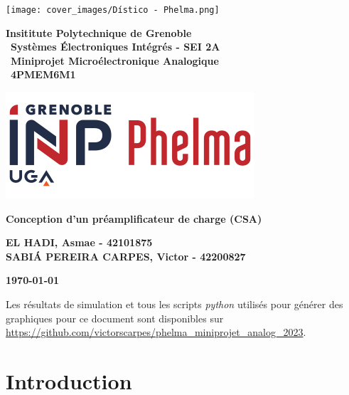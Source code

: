 \documentclass[a4paper,12pt]{article}
\numberwithin{equation}{section}
\newcommand{\?}{\stackrel{?}{=}}
\begin{document}
\noindent
    \parbox{2.3cm}{\texttt{[image: cover\_images/Dístico - Phelma.png]}}
    \parbox{11cm}{
        \begin{center}
            \textbf{Insititute Polytechnique de Grenoble}\\\
            \textbf{Systèmes Électroniques Intégrés - SEI 2A}  \\\
            \textbf{Miniprojet Microélectronique Analogique} \\\
            \textbf{4PMEM6M1} \\
            
        \end{center}
   }
   \parbox{3.1cm}{\includegraphics[width = .2\textwidth]{cover_images/Nouvo-logo-Phelma_web.jpg}}

\vspace{8.5cm}

\begin{center} 
\textbf{\Large Conception d'un préamplificateur de charge (CSA)}\\
\end{center}
\vspace{5cm}
\thispagestyle{empty}
\begin{flushright}
\textbf{EL HADI, Asmae - 42101875}\\
\textbf{SABIÁ PEREIRA CARPES, Victor - 42200827}\\
\end{flushright}
\vspace{4.5cm}
\begin{center}
\textbf{\today}
\end{center}

\newpage
{
  \hypersetup{linkcolor=black}
  \tableofcontents
}
\newpage
{
    \hypersetup{linkcolor=black}
    \listoffigures
}

\newpage

{
    \hypersetup{linkcolor=blue}
    
    Les résultats de simulation et tous les scripts \textit{python} utilisés pour générer des graphiques pour ce document sont disponibles sur \url{https://github.com/victorscarpes/phelma_miniprojet_analog_2023}.
}

\newpage
\section{Introduction}
\end{document}
